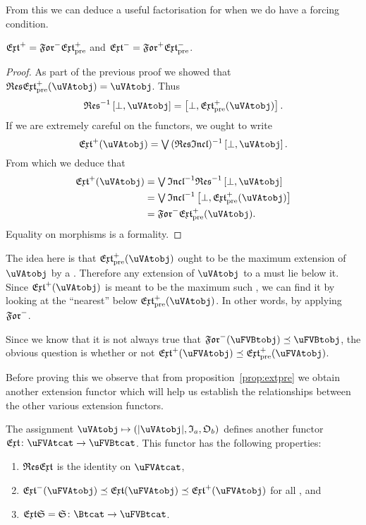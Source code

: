 \documentclass[%
12pt,%
arxiv,%
defaults
]{myclass}
\begin{document}
From this we can deduce a useful factorisation for when we do have a forcing condition.

\begin{corollary}
\(\Jextfunc = \Jforfunc \Jextfunc_\pre\) and \(\Mextfunc = \Mforfunc \Mextfunc_\pre\).
\end{corollary}

\begin{proof}
As part of the previous proof we showed that \(\resfunc \Jextfunc_\pre(\uVAtobj) = \uVAtobj\).
Thus
%
\[
  \resfunc^{-1} \left[\bot, \uVAtobj\right] = \left[\bot, \Jextfunc_\pre(\uVAtobj)\right].
\]
%
If we are extremely careful on the functors, we ought to write
%
\[
  \Jextfunc(\uVAtobj) = \join (\resfunc \incfunc)^{-1} \left[\bot,\uVAtobj \right].
\]
%
From which we deduce that
%
\begin{align*}
  \Jextfunc(\uVAtobj) &= \join \incfunc^{-1} \resfunc^{-1} \left[\bot, \uVAtobj \right] \\
%
&= \join \incfunc^{-1} \left[\bot, \Jextfunc_\pre(\uVAtobj) \right] \\
%
&= \Jforfunc \Jextfunc_\pre(\uVAtobj).
\end{align*}
%
Equality on morphisms is a formality.
\end{proof}


The idea here is that \(\Jextfunc_\pre(\uVAtobj)\) ought to be the maximum extension of \(\uVAtobj\) by a \uFVBtobj.
Therefore any extension of \(\uVAtobj\) to a \uFVBtobj must lie below it.
Since \(\Jextfunc(\uVAtobj)\) is meant to be the maximum such \uFVBtobj, we can find it by looking at the ``nearest'' \uFVBtobj below \(\Jextfunc_\pre(\uVAtobj)\).
In other words, by applying \(\Jforfunc\).

Since we know that it is not always true that \(\Jforfunc(\uFVBtobj) \preceq \uFVBtobj\), the obvious question is whether or not \(\Jextfunc(\uFVAtobj) \preceq \PJextfunc(\uFVAtobj)\).

Before proving this we observe that from proposition~\ref{prop:extpre} we obtain another extension functor which will help us establish the relationships between the other various extension functors.

\begin{lemma}
The assignment \(\uVAtobj \mapsto (\forfunc[\uVAtobj], \itest_a, \otest_b)\) defines another functor \(\extfunc \colon \uFVAtcat \to \uFVBtcat\).
This functor has the following properties:
%
\begin{enumerate}
\item \(\resfunc \extfunc\) is the identity on \(\uFVAtcat\),
\item \(\Mextfunc(\uFVAtobj) \preceq \extfunc(\uFVAtobj) \preceq \Jextfunc(\uFVAtobj)\) for all \uFVAtobjs[\uFVAtobj], and
\item \(\extfunc \sfunc = \sfunc \colon \Btcat \to \uFVBtcat\).
\end{enumerate}
\end{lemma}
\end{document}

